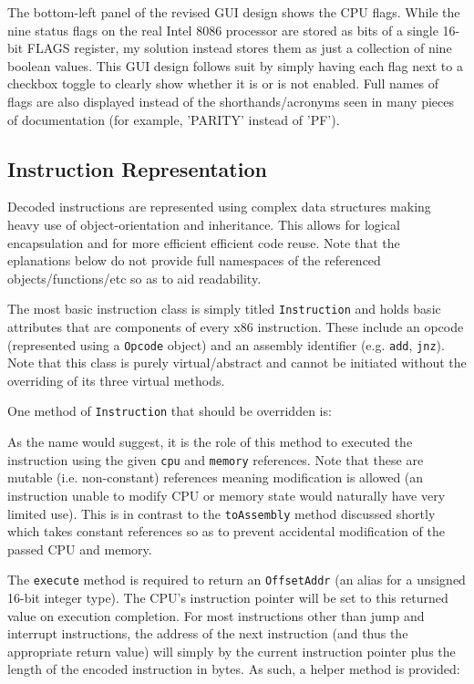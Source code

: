    The bottom-left panel of the revised GUI design shows the CPU flags. While the nine status flags on the real Intel 8086 processor are stored as bits of a single 16-bit FLAGS register, my solution instead stores them as just a collection of nine boolean values. This GUI design follows suit by simply having each flag next to a checkbox toggle to clearly show whether it is or is not enabled. Full names of flags are also displayed instead of the shorthands/acronyms seen in many pieces of documentation (for example, 'PARITY' instead of 'PF').


\subsection{Instruction Representation}
    Decoded instructions are represented using complex data structures making heavy use of object-orientation and inheritance. This allows for logical encapsulation and for more efficient efficient code reuse. Note that the eplanations below do not provide full namespaces of the referenced objects/functions/etc so as to aid readability.

    The most basic instruction class is simply titled \texttt{Instruction} and holds basic attributes that are components of every x86 instruction. These include an opcode (represented using a \texttt{Opcode} object) and an assembly identifier (e.g. \texttt{add}, \texttt{jnz}). Note that this class is purely virtual/abstract and cannot be initiated without the overriding of its three virtual methods.

    One method of \texttt{Instruction} that should be  overridden is: 

    As the name would suggest, it is the role of this method to executed the instruction using the given \texttt{cpu} and \texttt{memory} references. Note that these are mutable (i.e. non-constant) references meaning modification is allowed (an instruction unable to modify CPU or memory state would naturally have very limited use). This is in contrast to the \texttt{toAssembly} method discussed shortly which takes constant references so as to prevent accidental modification of the passed CPU and memory.

    The \texttt{execute} method is required to return an \texttt{OffsetAddr} (an alias for a unsigned 16-bit integer type). The CPU's instruction pointer will be set to this returned value on execution completion. For most instructions other than jump and interrupt instructions, the address of the next instruction (and thus the appropriate return value) will simply by the current instruction pointer plus the length of the encoded instruction in bytes. As such, a helper method is provided: 
    
